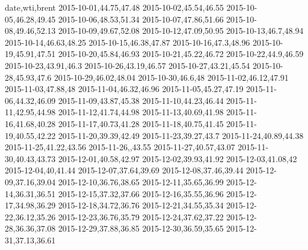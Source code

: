 date,wti,brent
2015-10-01,44.75,47.48
2015-10-02,45.54,46.55
2015-10-05,46.28,49.45
2015-10-06,48.53,51.34
2015-10-07,47.86,51.66
2015-10-08,49.46,52.13
2015-10-09,49.67,52.08
2015-10-12,47.09,50.95
2015-10-13,46.7,48.94
2015-10-14,46.63,48.25
2015-10-15,46.38,47.87
2015-10-16,47.3,48.96
2015-10-19,45.91,47.51
2015-10-20,45.84,46.93
2015-10-21,45.22,46.72
2015-10-22,44.9,46.59
2015-10-23,43.91,46.3
2015-10-26,43.19,46.57
2015-10-27,43.21,45.54
2015-10-28,45.93,47.6
2015-10-29,46.02,48.04
2015-10-30,46.6,48
2015-11-02,46.12,47.91
2015-11-03,47.88,48
2015-11-04,46.32,46.96
2015-11-05,45.27,47.19
2015-11-06,44.32,46.09
2015-11-09,43.87,45.38
2015-11-10,44.23,46.44
2015-11-11,42.95,44.98
2015-11-12,41.74,44.98
2015-11-13,40.69,41.98
2015-11-16,41.68,40.28
2015-11-17,40.73,41.28
2015-11-18,40.75,41.45
2015-11-19,40.55,42.22
2015-11-20,39.39,42.49
2015-11-23,39.27,43.7
2015-11-24,40.89,44.38
2015-11-25,41.22,43.56
2015-11-26,,43.55
2015-11-27,40.57,43.07
2015-11-30,40.43,43.73
2015-12-01,40.58,42.97
2015-12-02,39.93,41.92
2015-12-03,41.08,42
2015-12-04,40,41.44
2015-12-07,37.64,39.69
2015-12-08,37.46,39.44
2015-12-09,37.16,39.04
2015-12-10,36.76,38.65
2015-12-11,35.65,36.99
2015-12-14,36.31,36.51
2015-12-15,37.32,37.66
2015-12-16,35.55,36.96
2015-12-17,34.98,36.29
2015-12-18,34.72,36.76
2015-12-21,34.55,35.34
2015-12-22,36.12,35.26
2015-12-23,36.76,35.79
2015-12-24,37.62,37.22
2015-12-28,36.36,37.08
2015-12-29,37.88,36.85
2015-12-30,36.59,35.65
2015-12-31,37.13,36.61